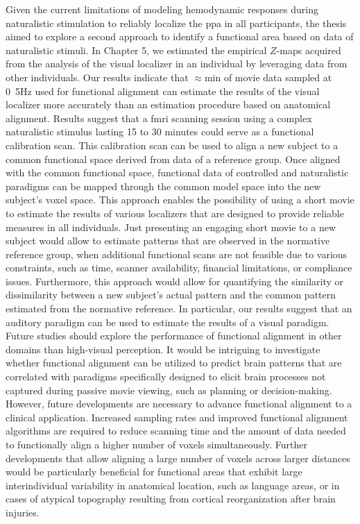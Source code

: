 %
Given the current limitations of modeling hemodynamic responses during
naturalistic stimulation to reliably localize the \ac{ppa} in all participants,
the thesis aimed to explore a second approach to identify a functional area
based on data of naturalistic stimuli.
%
In Chapter 5, we estimated the empirical $Z$-maps acquired from the analysis of
the visual localizer in an individual by leveraging data from other individuals.
%
Our results indicate that $\approx$\unit[15]{min} of movie data sampled at
\unit{0.5}{Hz} used for functional alignment can estimate the results of the
visual localizer more accurately than an estimation procedure based on
anatomical alignment.
%
Results suggest that a \ac{fmri} scanning session using a complex naturalistic
stimulus lasting 15 to 30 minutes could serve as a functional calibration scan.
%
This calibration scan can be used to align a new subject to a common functional
space derived from data of a reference group.
%
Once aligned with the common functional space, functional data of controlled and
naturalistic paradigms can be mapped through the common model space into the new
subject's voxel space.
%
This approach enables the possibility of using a short movie to estimate the
results of various localizers that are designed to provide reliable measures in
all individuals.
%
Just presenting an engaging short movie to a new subject would allow to estimate
patterns that are observed in the normative reference group, when additional
functional scans are not feasible due to various constraints, such as time,
scanner availability, financial limitations, or compliance issues.
%
Furthermore, this approach would allow for quantifying the similarity or
dissimilarity between a new subject's actual pattern and the common pattern
estimated from the normative reference.
%
In particular, our results suggest that an auditory paradigm can be used to
estimate the results of a visual paradigm.
%
Future studies should explore the performance of functional alignment in other
domains than high-visual perception.
%
It would be intriguing to investigate whether functional alignment can be
utilized to predict brain patterns that are correlated with paradigms
specifically designed to elicit brain processes not captured during passive
movie viewing, such as planning or decision-making.
%
However, future developments are necessary to advance functional alignment to a
clinical application.
%
Increased sampling rates and improved functional alignment algorithms are
required to reduce scanning time and the amount of data needed to functionally
align a higher number of voxels simultaneously.
%
Further developments that allow aligning a large number of voxels across larger
distances would be particularly beneficial for functional areas that exhibit
large interindividual variability in anatomical location, such as language
areas, or in cases of atypical topography resulting from cortical reorganization
after brain injuries.



